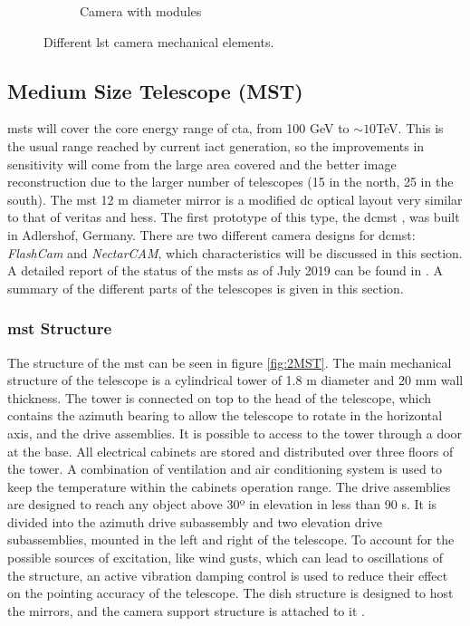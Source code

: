 \documentclass[main.tex]{subfiles}
\begin{document}
\begin{figure}[h]
\begin{subfigure}{0.31\textwidth}
    \caption{Camera with modules} \label{fig:1c}
  \end{subfigure}

  \caption{Different \gls{lst} camera mechanical elements.} \label{fig:LSTcammech}
\end{figure}


\subsection{Medium Size Telescope (MST)} \label{sec:MST}

\glspl{mst} will cover the core energy range of \gls{cta}, from 100 GeV to $\sim 10$TeV. This is the usual range reached by current \gls{iact} generation, so the improvements in sensitivity will come from the large area covered and the better image reconstruction due to the larger number of telescopes (15 in the north, 25 in the south).
The \gls{mst} 12 m diameter mirror is a modified \gls{dc} optical layout very similar to that of \gls{veritas} and \gls{hess}. The first prototype of this type, the \gls{dcmst} \cite{2017SCMSTstatus}, was built in Adlershof, Germany. There are two different camera designs for \gls{dcmst}: \textit{FlashCam} and \textit{NectarCAM}, which characteristics will be discussed in this section.
A detailed report of the status of the \glspl{mst} as of July 2019 can be found in \cite{2019MSTreport}. A summary of the different parts of the telescopes is given in this section.

\subsubsection{\gls{mst} Structure}

The structure of the \gls{mst} can be seen in figure \ref{fig:2MST}.
The main mechanical structure of the telescope is a cylindrical tower of 1.8 m diameter and 20 mm wall thickness. The tower is connected on top to the head of the telescope, which contains the azimuth bearing to allow the telescope to rotate in the horizontal axis, and the drive assemblies. It is possible to access to the tower through a door at the base. All electrical cabinets are stored and distributed over three floors of the tower. A combination of ventilation and air conditioning system is used to keep the temperature within the cabinets operation range.
The drive assemblies are designed to reach any object above 30º in elevation in less than 90 s. It is divided into the azimuth drive subassembly and two elevation drive subassemblies, mounted in the left and right of the telescope.
To account for the possible sources of excitation, like wind gusts, which can lead to oscillations of the structure, an active vibration damping control is used to reduce their effect on the pointing accuracy of the telescope.
The dish structure is designed to host the mirrors, and the camera support structure is attached to it \cite{2015DCMSTstatus}.
\end{document}
